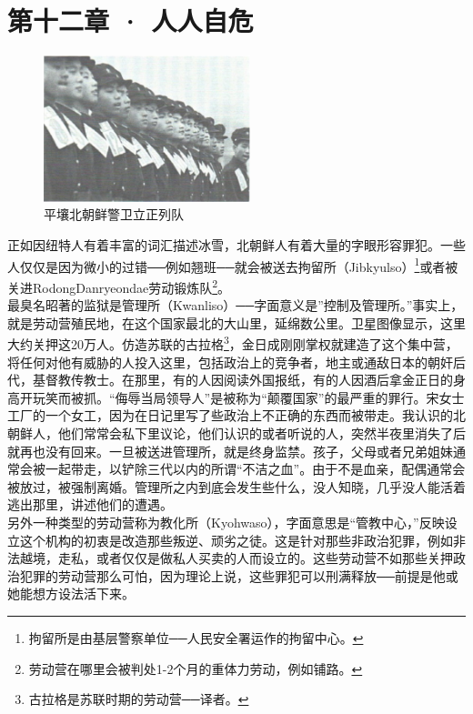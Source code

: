 \fancyhead[RO]{\thepage}
\fancyhead[LE]{\thepage}
\fancyfoot[LE,RO]{}
\fancyfoot[LO,CE]{}
\fancyfoot[CO,RE]{}
\chapter*{第十二章 · 人人自危}
\begin{figure}[!htbp]
	\centering
	\includegraphics[width=6cm]{./Chapters/Images/12.jpg}
	\caption*{平壤北朝鲜警卫立正列队}
\end{figure}


正如因纽特人有着丰富的词汇描述冰雪，北朝鲜人有着大量的字眼形容罪犯。一些人仅仅是因为微小的过错──例如翘班──就会被送去拘留所（Jibkyulso）\footnote{拘留所是由基层警察单位──人民安全署运作的拘留中心。}或者被关进RodongDanryeondae劳动锻炼队\footnote{劳动营在哪里会被判处1-2个月的重体力劳动，例如铺路。}。\\

最臭名昭著的监狱是管理所（Kwanliso）──字面意义是”控制及管理所。”事实上，就是劳动营殖民地，在这个国家最北的大山里，延绵数公里。卫星图像显示，这里大约关押这20万人。仿造苏联的古拉格\footnote{古拉格是苏联时期的劳动营──译者。}，金日成刚刚掌权就建造了这个集中营，将任何对他有威胁的人投入这里，包括政治上的竞争者，地主或通敌日本的朝奸后代，基督教传教士。在那里，有的人因阅读外国报纸，有的人因酒后拿金正日的身高开玩笑而被抓。“侮辱当局领导人”是被称为“颠覆国家”的最严重的罪行。宋女士工厂的一个女工，因为在日记里写了些政治上不正确的东西而被带走。我认识的北朝鲜人，他们常常会私下里议论，他们认识的或者听说的人，突然半夜里消失了后就再也没有回来。一旦被送进管理所，就是终身监禁。孩子，父母或者兄弟姐妹通常会被一起带走，以铲除三代以内的所谓“不洁之血”。由于不是血亲，配偶通常会被放过，被强制离婚。管理所之内到底会发生些什么，没人知晓，几乎没人能活着逃出那里，讲述他们的遭遇。\\

另外一种类型的劳动营称为教化所（Kyohwaso），字面意思是“管教中心，”反映设立这个机构的初衷是改造那些叛逆、顽劣之徒。这是针对那些非政治犯罪，例如非法越境，走私，或者仅仅是做私人买卖的人而设立的。这些劳动营不如那些关押政治犯罪的劳动营那么可怕，因为理论上说，这些罪犯可以刑满释放──前提是他或她能想方设法活下来。\\

